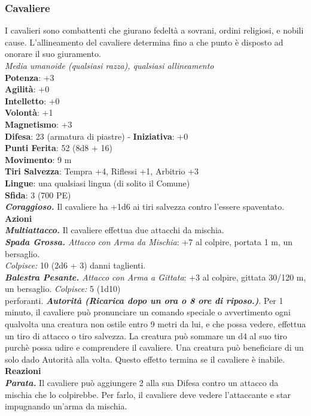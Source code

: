 \begin{multicols}{2}
\subsubsection*{Cavaliere}
I cavalieri sono combattenti che giurano fedeltà a sovrani, ordini religiosi, e nobili cause. L'allineamento del cavaliere determina fino a che punto è disposto ad onorare il suo giuramento. \\
\emph{Media umanoide (qualsiasi razza), qualsiasi allineamento}\\
\textbf{Potenza}: +3\\
\textbf{Agilità}: +0\\
\textbf{Intelletto}: +0\\
\textbf{Volontà}: +1\\
\textbf{Magnetismo}: +3\\
\textbf{Difesa}: 23 (armatura di piastre) - \textbf{Iniziativa}: +0\\
\textbf{Punti Ferita}: 52 (8d8 + 16)\\
\textbf{Movimento}: 9 m\\
\textbf{Tiri Salvezza}: Tempra +4, Riflessi +1, Arbitrio +3 \\
\textbf{Lingue}: una qualsiasi lingua (di solito il Comune)\\
\textbf{Sfida}: 3 (700 PE)\smallskip\\
\emph{\textbf{Coraggioso.}} Il cavaliere ha +1d6 ai tiri salvezza contro l'essere spaventato.\\
\smallskip\textbf{Azioni}\\
\emph{\textbf{Multiattacco.}} Il cavaliere effettua due attacchi da mischia.\\
\emph{\textbf{Spada Grossa.} Attacco con Arma da Mischia}: +7 al colpire, portata 1 m, un bersaglio.\\
\emph{Colpisce:} 10 (2d6 + 3) danni taglienti.\\
\emph{\textbf{Balestra Pesante.} Attacco con Arma a Gittata}: +3 al colpire, gittata 30/120 m, un bersaglio. \emph{Colpisce:} 5 (1d10)\\
perforanti.
\emph{\textbf{Autorità (Ricarica dopo un ora o 8 ore di riposo.)}}. Per 1 minuto, il cavaliere può pronunciare un comando speciale o avvertimento ogni qualvolta una creatura non ostile entro 9 metri da lui, e che possa vedere, effettua un tiro di attacco o tiro salvezza. La creatura può sommare un d4 al suo tiro purchè possa udire e comprendere il cavaliere. Una creatura può beneficiare di un solo dado Autorità alla volta. Questo effetto termina se il cavaliere è inabile. \\
\textbf{Reazioni}\\
\emph{\textbf{Parata.}} Il cavaliere può aggiungere 2 alla sua Difesa contro un attacco da mischia che lo colpirebbe. Per farlo, il cavaliere deve vedere l'attaccante e star impugnando un'arma da mischia.\\


\end{multicols}
